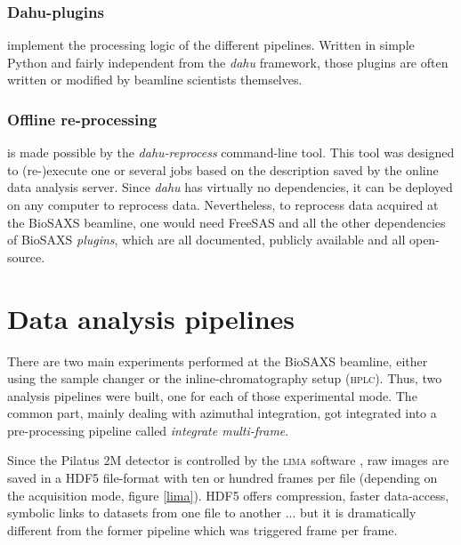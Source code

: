 \documentclass[preprint]{iucr}              %
\begin{document}
\subsubsection{Dahu-plugins} implement the processing logic of the different pipelines.
Written in simple Python and fairly independent from the \textit{dahu} framework, those plugins are often written or modified by beamline scientists themselves.

\subsubsection{Offline re-processing}
is made possible by the \textit{dahu-reprocess} command-line tool.
This tool was designed to (re-)execute one or several jobs based on the description saved by the online data analysis server. 
Since \textit{dahu} has virtually no dependencies, it can be deployed on any computer to reprocess data. 
Nevertheless, to reprocess data acquired at the BioSAXS beamline, one would need FreeSAS and all the other dependencies of BioSAXS \textit{plugins}, which are all documented, publicly available and all open-source.

\section{Data analysis pipelines}
\label{pipeline}
There are two main experiments performed at the BioSAXS beamline, either using the sample changer or the inline-chromatography setup (\textsc{hplc}).
Thus, two analysis pipelines were built, one for each of those experimental mode.
The common part, mainly dealing with azimuthal integration, got integrated into a pre-processing pipeline called \textit{integrate multi-frame}.

Since the Pilatus 2M detector is controlled by the \textsc{lima} software \cite{lima}, raw images are saved in a HDF5 file-format \cite{hdf5} with ten or hundred frames per file (depending on the acquisition mode, figure \ref{lima}).
HDF5 offers compression, faster data-access, symbolic links to datasets from one file to another ... but it is dramatically different from the former pipeline which was triggered frame per frame.
\end{document}
